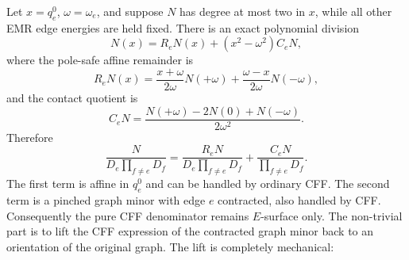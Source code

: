 \documentclass[11pt,a4paper]{report}
\begin{document}
Let \(x=q_e^0\), \(\omega=\omega_e\), and suppose \(N\) has degree at most two
in \(x\), while all other EMR edge energies are held fixed.  There is an exact
polynomial division
\begin{equation}
  N(x)=R_eN(x)+\left(x^2-\omega^2\right)C_eN,
  \label{eq:quadratic-division}
\end{equation}
where the pole-safe affine remainder is
\begin{equation}
  R_eN(x)=
  \frac{x+\omega}{2\omega}N(+\omega)
  +
  \frac{\omega-x}{2\omega}N(-\omega),
  \label{eq:quadratic-remainder}
\end{equation}
and the contact quotient is
\begin{equation}
  C_eN=
  \frac{N(+\omega)-2N(0)+N(-\omega)}{2\omega^2}.
  \label{eq:quadratic-contact}
\end{equation}
Therefore
\begin{equation}
  \frac{N}{D_e\prod_{f\ne e}D_f}
  =
  \frac{R_eN}{D_e\prod_{f\ne e}D_f}
  +
  \frac{C_eN}{\prod_{f\ne e}D_f}.
  \label{eq:quadratic-master}
\end{equation}
The first term is affine in \(q_e^0\) and can be handled by ordinary CFF.  The
second term is a pinched graph minor with edge \(e\) contracted, also handled by
CFF.  Consequently the pure CFF denominator remains \(E\)-surface only.  The
non-trivial part is to lift the CFF expression of the contracted graph minor
back to an orientation of the original graph.  The lift is completely
mechanical:
\end{document}
